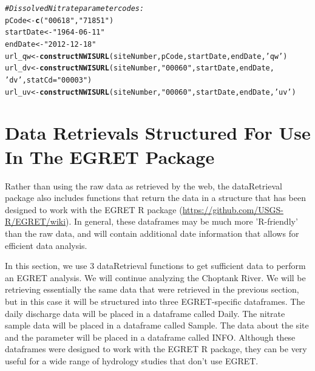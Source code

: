 \documentclass[a4paper,11pt]{article}\usepackage[]{graphicx}\usepackage[]{color}
\makeatletter
\newcommand{\hlstr}[1]{\textcolor[rgb]{0.192,0.494,0.8}{#1}}%
\newcommand{\hlcom}[1]{\textcolor[rgb]{0.678,0.584,0.686}{\textit{#1}}}%
\newcommand{\hlstd}[1]{\textcolor[rgb]{0.345,0.345,0.345}{#1}}%
\newcommand{\hlkwb}[1]{\textcolor[rgb]{0.69,0.353,0.396}{#1}}%
\newcommand{\hlkwc}[1]{\textcolor[rgb]{0.333,0.667,0.333}{#1}}%
\newcommand{\hlkwd}[1]{\textcolor[rgb]{0.737,0.353,0.396}{\textbf{#1}}}%
\newenvironment{kframe}{%
 \def\at@end@of@kframe{}%
 \ifinner\ifhmode%
  \def\at@end@of@kframe{\end{minipage}}%
  \begin{minipage}{\columnwidth}%
 \fi\fi%
 \def\FrameCommand##1{\hskip\@totalleftmargin \hskip-\fboxsep
 \colorbox{shadecolor}{##1}\hskip-\fboxsep
     \hskip-\linewidth \hskip-\@totalleftmargin \hskip\columnwidth}%
 \MakeFramed {\advance\hsize-\width
   \@totalleftmargin\z@ \linewidth\hsize
   \@setminipage}}%
 {\par\unskip\endMakeFramed%
 \at@end@of@kframe}
\newenvironment{knitrout}{}{} %
\makeatother
\begin{document}
\begin{knitrout}
\color{fgcolor}\begin{kframe}
\begin{alltt}
\hlcom{# Dissolved Nitrate parameter codes:}
\hlstd{pCode} \hlkwb{<-} \hlkwd{c}\hlstd{(}\hlstr{"00618"}\hlstd{,}\hlstr{"71851"}\hlstd{)}
\hlstd{startDate} \hlkwb{<-} \hlstr{"1964-06-11"}
\hlstd{endDate} \hlkwb{<-} \hlstr{"2012-12-18"}
\hlstd{url_qw} \hlkwb{<-} \hlkwd{constructNWISURL}\hlstd{(siteNumber,pCode,startDate,endDate,}\hlstr{'qw'}\hlstd{)}
\hlstd{url_dv} \hlkwb{<-} \hlkwd{constructNWISURL}\hlstd{(siteNumber,}\hlstr{"00060"}\hlstd{,startDate,endDate,}
                           \hlstr{'dv'}\hlstd{,}\hlkwc{statCd}\hlstd{=}\hlstr{"00003"}\hlstd{)}
\hlstd{url_uv} \hlkwb{<-} \hlkwd{constructNWISURL}\hlstd{(siteNumber,}\hlstr{"00060"}\hlstd{,startDate,endDate,}\hlstr{'uv'}\hlstd{)}
\end{alltt}
\end{kframe}
\end{knitrout}


\FloatBarrier

\section{Data Retrievals Structured For Use In The EGRET Package}
\label{sec:EGRETdfs}
Rather than using the raw data as retrieved by the web, the dataRetrieval package also includes functions that return the data in a structure that has been designed to work with the EGRET R package (\url{https://github.com/USGS-R/EGRET/wiki}). In general, these dataframes may be much more 'R-friendly' than the raw data, and will contain additional date information that allows for efficient data analysis.

In this section, we use 3 dataRetrieval functions to get sufficient data to perform an EGRET analysis.  We will continue analyzing the Choptank River. We will be retrieving essentially the same data that were retrieved in the previous section, but in this case it will be structured into three EGRET-specific dataframes.  The daily discharge data will be placed in a dataframe called Daily.  The nitrate sample data will be placed in a dataframe called Sample.  The data about the site and the parameter will be placed in a dataframe called INFO.  Although these dataframes were designed to work with the EGRET R package, they can be very useful for a wide range of hydrology studies that don't use EGRET.
\end{document}
